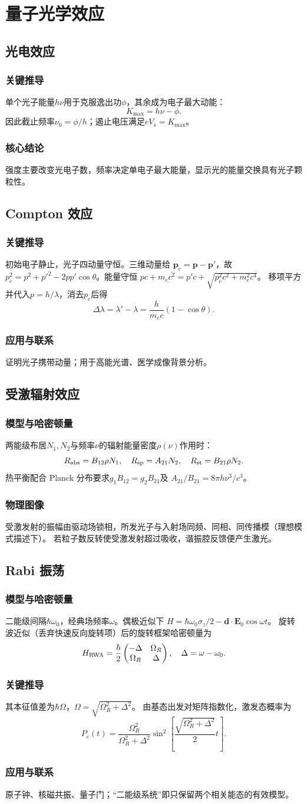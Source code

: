 \documentclass[12pt,a4paper,openany,fontset=fandol]{ctexrep}
\newcommand{\Physical}{\subsection*{物理图像}}
\newcommand{\Model}{\subsection*{模型与哈密顿量}}
\newcommand{\Derivation}{\subsection*{关键推导}}
\newcommand{\Conclusion}{\subsection*{核心结论}}
\newcommand{\Application}{\subsection*{应用与联系}}
\begin{document}
\chapter{量子光学效应}
\section{光电效应}
\Derivation
单个光子能量$h\nu$用于克服逸出功$\phi$，其余成为电子最大动能：
\begin{equation}K_{\max}=h\nu-\phi.\end{equation}
因此截止频率$\nu_0=\phi/h$；遏止电压满足$eV_s=K_{\max}$。
\Conclusion
强度主要改变光电子数，频率决定单电子最大能量，显示光的能量交换具有光子颗粒性。

\section{Compton 效应}
\Derivation
初始电子静止，光子四动量守恒。三维动量给
$\bm p_e=\bm p-\bm p'$，故
$p_e^2=p^2+p'^2-2pp'\cos\theta$。能量守恒
$pc+m_ec^2=p'c+\sqrt{p_e^2c^2+m_e^2c^4}$。
移项平方并代入$p=h/\lambda$，消去$p_e$后得
\begin{equation}\Delta\lambda=\lambda'-\lambda
=\frac{h}{m_ec}(1-\cos\theta).\end{equation}
\Application
证明光子携带动量；用于高能光谱、医学成像背景分析。

\section{受激辐射效应}
\Model
两能级布居$N_1,N_2$与频率$\nu$的辐射能量密度$\rho(\nu)$作用时：
\[
R_{\rm abs}=B_{12}\rho N_1,\quad
R_{\rm sp}=A_{21}N_2,\quad
R_{\rm st}=B_{21}\rho N_2.
\]
热平衡配合 Planck 分布要求$g_1B_{12}=g_2B_{21}$及
$A_{21}/B_{21}=8\pi h\nu^3/c^3$。
\Physical
受激发射的振幅由驱动场锁相，所发光子与入射场同频、同相、同传播模（理想模式描述下）。
若粒子数反转使受激发射超过吸收，谐振腔反馈便产生激光。

\section{Rabi 振荡}
\Model
二能级间隔$\hbar\omega_0$，经典场频率$\omega$。偶极近似下
$H=\hbar\omega_0\sigma_z/2-\bm d\cdot\bm E_0\cos\omega t$。
旋转波近似（丢弃快速反向旋转项）后的旋转框架哈密顿量为
\[
H_{\rm RWA}=\frac{\hbar}{2}
\begin{pmatrix}-\Delta&\Omega_R\\ \Omega_R&\Delta\end{pmatrix},
\quad\Delta=\omega-\omega_0.
\]
\Derivation
其本征值差为$\hbar\Omega$，$\Omega=\sqrt{\Omega_R^2+\Delta^2}$。
由基态出发对矩阵指数化，激发态概率为
\begin{equation}P_e(t)=\frac{\Omega_R^2}{\Omega_R^2+\Delta^2}
\sin^2\left[\frac{\sqrt{\Omega_R^2+\Delta^2}}{2}t\right].\end{equation}
\Application
原子钟、核磁共振、量子门；“二能级系统”即只保留两个相关能态的有效模型。
\end{document}
